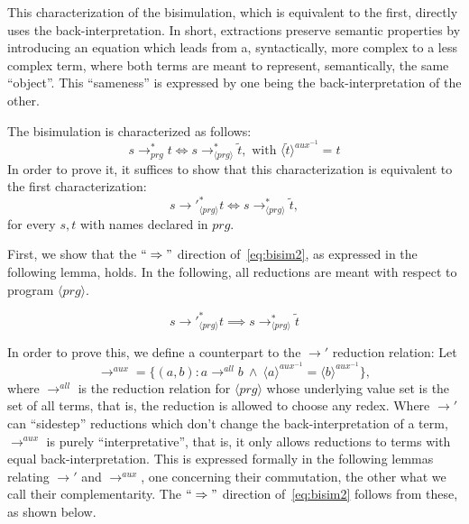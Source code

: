 This characterization of the bisimulation, which is equivalent to the first, directly uses the back-interpretation. In short, extractions preserve semantic properties by introducing an equation which leads from a, syntactically, more complex to a less complex term, where both terms are meant to represent, semantically, the same ``object''. This ``sameness'' is expressed by one being the back-interpretation of the other.

The bisimulation is characterized as follows:
\[
s {\longrightarrow}_{prg}^* t \iff s \longrightarrow^*_{\langle prg \rangle} \widetilde{t}, \text{ with } \langle \widetilde{t} \rangle^{aux^{-1}} = t
\]
In order to prove it, it suffices to show that this characterization is equivalent to the first characterization:
\begin{equation}
\label{eq:bisim2}
s {\longrightarrow'}_{\langle prg \rangle}^* t \iff s \longrightarrow^*_{\langle prg \rangle} \widetilde{t},
\end{equation}
for every $s, t$ with names declared in $prg$.

First, we show that the $`` \Rightarrow "$ direction of~\ref{eq:bisim2}, as expressed in the following lemma, holds. In the following, all reductions are meant with respect to program $\langle prg \rangle$.

\begin{lemma}
\label{lem:prop2lr}
\[
s {\longrightarrow'}_{\langle prg \rangle}^* t \implies s \longrightarrow^*_{\langle prg \rangle} \widetilde{t}
\]
\end{lemma}

In order to prove this, we define a counterpart to the $\longrightarrow'$ reduction relation: Let
\[
\longrightarrow^{aux} = \{(a,b) : a \longrightarrow^{all} b ~ \land ~ \langle a \rangle^{aux^{-1}} = \langle b \rangle^{aux^{-1}}\},
\]
where $\longrightarrow^{all}$ is the reduction relation for $\langle prg \rangle$ whose underlying value set is the set of all terms, that is, the reduction is allowed to choose any redex. Where $\longrightarrow'$ can ``sidestep'' reductions which don't change the back-interpretation of a term, $\longrightarrow^{aux}$ is purely ``interpretative'', that is, it only allows reductions to terms with equal back-interpretation. This is expressed formally in the following lemmas relating $\longrightarrow'$ and $\longrightarrow^{aux}$, one concerning their commutation, the other what we call their complementarity. The $`` \Rightarrow "$ direction of~\ref{eq:bisim2} follows from these, as shown below.

